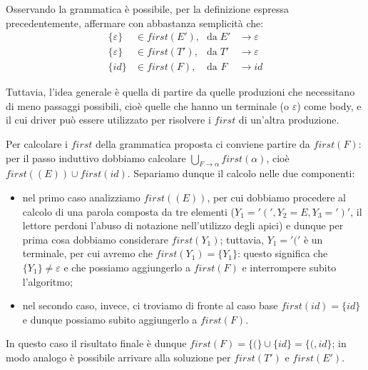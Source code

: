\documentclass[class=book, crop=false, oneside, 12pt]{standalone}
\begin{document}
Osservando la grammatica è possibile, per la definizione espressa precedentemente, affermare con abbastanza semplicità che: 
\begin{align*}
    \{\varepsilon\} &\in first(E')\textrm{,} &\textrm{da}\; E' &\to \varepsilon \\
    \{\varepsilon\} &\in first(T')\textrm{,} &\textrm{da}\; T' &\to \varepsilon \\
    \{id\} &\in first(F)\textrm{,} &\textrm{da } F\; &\to id
\end{align*}

Tuttavia, l'idea generale è quella di partire da quelle produzioni che necessitano di meno passaggi possibili, cioè quelle che hanno un terminale (o \(\varepsilon\)) come body, e il cui driver può essere utilizzato per risolvere i \(first\) di un'altra produzione.

Per calcolare i \(first\) della grammatica proposta ci conviene partire da \(first(F)\): per il passo induttivo dobbiamo calcolare \(\bigcup_{F \to \alpha} first(\alpha)\), cioè \(first((E)) \cup first(id)\). Separiamo dunque il calcolo nelle due componenti:
\begin{itemize}
    \item nel primo caso analizziamo \(first((E))\), per cui dobbiamo procedere al calcolo di una parola composta da tre elementi (\(Y_1 = '(', Y_2 = E, Y_3 = ')'\), il lettore perdoni l'abuso di notazione nell'utilizzo degli apici) e dunque per prima cosa dobbiamo considerare \(first(Y_1)\); tuttavia, \(Y_1 = '('\) è un terminale, per cui avremo che \(first(Y_1) = \{Y_1\}\): questo significa che \(\{Y_1\} \neq \varepsilon\) e che possiamo aggiungerlo a \(first(F)\) e interrompere subito l'algoritmo;
    \item nel secondo caso, invece, ci troviamo di fronte al caso base \(first(id) = \{id\}\) e dunque possiamo subito aggiungerlo a \(first(F)\).
\end{itemize}
In questo caso il risultato finale è dunque \(first(F) = \{(\} \cup \{id\} = \{(, id\}\); in modo analogo è possibile arrivare alla soluzione per \(first(T')\) e \(first(E')\).
\end{document}
